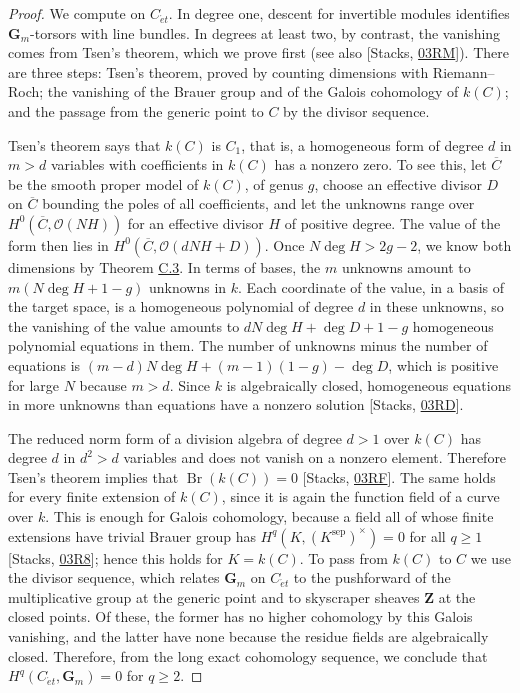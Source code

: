 \documentclass[11pt]{article}
\begin{document}
\begin{proof}[{Proof}]\label{bp177}%
We compute on \(C_{\acute{e}t}\). In degree one, descent for invertible modules identifies \(\mathbf G_m\)-torsors with line bundles. In degrees at least two, by contrast, the vanishing comes from Tsen's theorem, which we prove first (see also [Stacks, \href{https://stacks.math.columbia.edu/tag/03RM}{03RM}]). There are three steps: Tsen's theorem, proved by counting dimensions with Riemann–Roch; the vanishing of the Brauer group and of the Galois cohomology of \(k(C)\); and the passage from the generic point to \(C\) by the divisor sequence.

Tsen's theorem says that \(k(C)\) is \(C_1\), that is, a homogeneous form of degree \(d\) in \(m>d\) variables with coefficients in \(k(C)\) has a nonzero zero.  To see this, let \(\overline C\) be the smooth proper model of \(k(C)\), of genus \(g\), choose an effective divisor \(D\) on \(\overline C\) bounding the poles of all coefficients, and let the unknowns range over \(H^0(\overline C,\mathcal O(NH))\) for an effective divisor \(H\) of positive degree.  The value of the form then lies in \(H^0(\overline C,\mathcal O(dNH+D))\).  Once \(N\deg H>2g-2\), we know both dimensions by Theorem \hyperref[bp130]{C.3}.  In terms of bases, the \(m\) unknowns amount to \(m(N\deg H+1-g)\) unknowns in \(k\). Each coordinate of the value, in a basis of the target space, is a homogeneous polynomial of degree \(d\) in these unknowns, so the vanishing of the value amounts to \(dN\deg H+\deg D+1-g\) homogeneous polynomial equations in them.  The number of unknowns minus the number of equations is \((m-d)N\deg H+(m-1)(1-g)-\deg D\), which is positive for large \(N\) because \(m>d\).  Since \(k\) is algebraically closed, homogeneous equations in more unknowns than equations have a nonzero solution [Stacks, \href{https://stacks.math.columbia.edu/tag/03RD}{03RD}].

The reduced norm form of a division algebra of degree \(d>1\) over \(k(C)\) has degree \(d\) in \(d^2>d\) variables and does not vanish on a nonzero element.  Therefore Tsen's theorem implies that \(\operatorname{Br}(k(C))=0\) [Stacks, \href{https://stacks.math.columbia.edu/tag/03RF}{03RF}].  The same holds for every finite extension of \(k(C)\), since it is again the function field of a curve over \(k\). This is enough for Galois cohomology, because a field all of whose finite extensions have trivial Brauer group has \(H^q(K,(K^{\mathrm{sep}})^\times)=0\) for all \(q\geq1\) [Stacks, \href{https://stacks.math.columbia.edu/tag/03R8}{03R8}]; hence this holds for \(K=k(C)\). To pass from \(k(C)\) to \(C\) we use the divisor sequence, which relates \(\mathbf G_m\) on \(C_{\acute{e}t}\) to the pushforward of the multiplicative group at the generic point and to skyscraper sheaves \(\mathbf Z\) at the closed points. Of these, the former has no higher cohomology by this Galois vanishing, and the latter have none because the residue fields are algebraically closed. Therefore, from the long exact cohomology sequence, we conclude that \(H^q(C_{\acute{e}t},\mathbf G_m)=0\) for \(q\geq2\).


\end{proof}
\end{document}
